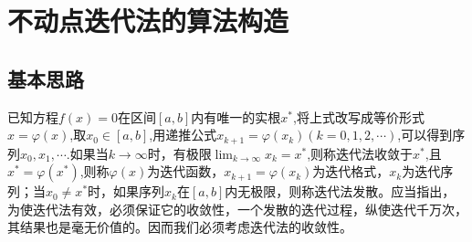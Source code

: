\section{不动点迭代法的算法构造}
\subsection{基本思路}
已知方程$f(x)=0$在区间$[a,b]$内有唯一的实根$x^*$,将上式改写成等价形式$x=\varphi(x)$,取$x_0\in[a,b]$,用递推公式$x_{k+1}=\varphi(x_k)(k=0,1,2,\cdots)$,可以得到序列$x_0,x_1,\cdots$.如果当$k\rightarrow\infty$时，有极限$ \lim_{k\to\infty}x_k=x^*$,则称迭代法收敛于$x^*$,且$x^*=\varphi(x^*)$,则称$\varphi(x)为迭代函数$，$x_{k+1}=\varphi(x_k)$为迭代格式，${x_k}$为迭代序列；当$x_0\neq x^*$时，如果序列${x_k}$在$[a,b]$内无极限，则称迭代法发散。应当指出，为使迭代法有效，必须保证它的收敛性，一个发散的迭代过程，纵使迭代千万次，其结果也是毫无价值的。因而我们必须考虑迭代法的收敛性。
